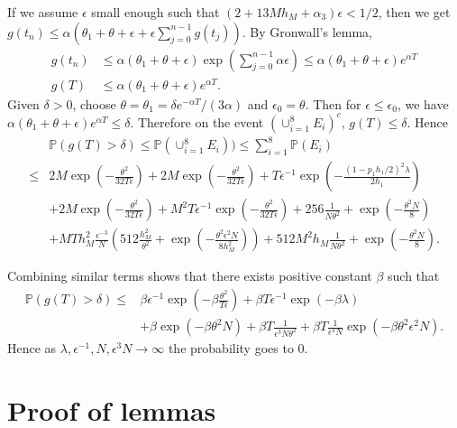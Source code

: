 \documentclass[12pt]{article}
\def\P{\mathbb{P}}
\numberwithin{equation}{section}  %
\begin{document}
If we assume $\epsilon$ small enough such that $(2+13 M h_M+\alpha_3)\epsilon <1/2$, then we get
$g(t_n)\leq \alpha\left(
\theta_1+\theta+\epsilon+\epsilon \sum_{j=0}^{n-1}  g(t_{j})
\right)$. By Gronwall's lemma,
\begin{align*}
g(t_n) &\leq \alpha (\theta_1+\theta+\epsilon)\exp{ 
\left(
\sum_{j=0}^{n-1} \alpha \epsilon 
\right)
}\leq \alpha (\theta_1+\theta+\epsilon)e^{\alpha T}\\
g(T)&\leq \alpha (\theta_1+\theta+\epsilon)e^{\alpha T}.
\end{align*}
Given $\delta>0$, choose $\theta=\theta_1=\delta e^{-\alpha T}/(3\alpha)$ and $\epsilon_0=\theta$. Then for $\epsilon\leq \epsilon_0$, we have $\alpha (\theta_1+\theta+\epsilon)e^{\alpha T}\leq \delta$. Therefore on the event $(\cup_{i=1}^8 E_i)^c$, $g(T)\leq \delta$. Hence
{\footnotesize
\begin{align*} 
&\P(g(T)>\delta)\leq \P(\cup_{i=1}^8 E_i)) \leq \sum_{i=1}^8 \P(E_i)\\
\leq& 2M\exp\left(-\frac{\theta^2}{32T\epsilon}\right) +2M\exp\left(-\frac{\theta^2}{32T\epsilon}\right) +T\epsilon^{-1} \exp\left(-\frac{(1-p_1h_1/2)^2\lambda}{2h_1}\right)\\
& +2M \exp\left(-\frac{\theta^2}{32 T \epsilon}\right) +M^2T\epsilon^{-1}\exp\left(-\frac{\theta^2}{32T\epsilon}\right)+ 256\frac{1}{N\theta^2}+\exp{\left(-\frac{\theta^2 N}{8}\right)}\\
& +M T h_M^2 \frac{\epsilon^{-3}}{N}
\left(
512\frac{h_M^2}{\theta^2}+\exp\left(
-\frac{\theta^2 \epsilon^2 N}{8h^2_M}\right)
\right)+ 512 M^2 h_M\frac{1}{N\theta^2}+\exp\left(
-\frac{\theta^2N}{8}\right).
\end{align*}}

Combining similar terms shows that there exists positive constant $\beta$ such that
\begin{align*} 
\P(g(T)>\delta)\leq& \beta\epsilon^{-1}\exp\left(-\beta \frac{\theta^2}{T\epsilon} \right)+\beta T\epsilon^{-1}\exp\left(-\beta\lambda\right)\\
&+\beta \exp\left(-\beta\theta^2N\right)+\beta T\frac{1}{\epsilon^3N\theta^2}+\beta T\frac{1}{\epsilon^3N}\exp\left(-\beta\theta^2\epsilon^2N\right).
\end{align*} 
Hence as $\lambda,\epsilon^{-1},N,\epsilon^3N\rightarrow \infty$ the probability goes to 0.


\section{Proof of lemmas}\label{k_proofoflemmas}
\end{document}

